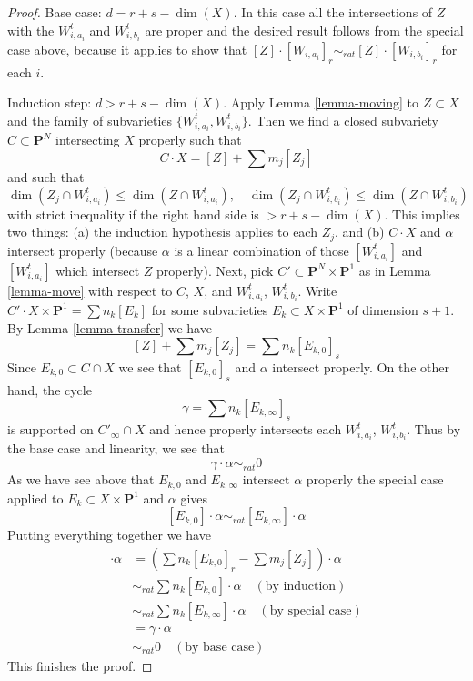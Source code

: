 \begin{proof}
\medskip\noindent
Base case: $d = r + s - \dim(X)$. In this case all the intersections of
$Z$ with the $W_{i, a_i}^t$ and $W_{i, b_i}^t$ are proper and the
desired result follows from the special case above, because
it applies to show that
$[Z] \cdot [W_{i, a_i}]_r \sim_{rat} [Z] \cdot [W_{i, b_i}]_r$ for
each $i$.

\medskip\noindent
Induction step: $d >  r + s - \dim(X)$. Apply
Lemma \ref{lemma-moving} to $Z \subset X$ and
the family of subvarieties $\{W_{i, a_i}^t, W_{i, b_i}^t\}$. Then we find a
closed subvariety $C \subset \mathbf{P}^N$ intersecting $X$
properly such that
$$
C \cdot X = [Z] + \sum m_j [Z_j]
$$
and such that
$$
\dim(Z_j \cap W_{i, a_i}^t) \leq \dim(Z \cap W_{i, a_i}^t),\quad
\dim(Z_j \cap W_{i, b_i}^t) \leq \dim(Z \cap W_{i, b_i}^t)
$$
with strict inequality if the right hand side is $> r + s - \dim(X)$.
This implies two things: (a) the induction hypothesis applies to
each $Z_j$, and (b) $C \cdot X$ and $\alpha$ intersect properly (because
$\alpha$ is a linear combination of those $[W_{i, a_i}^t]$ and
$[W_{i, a_i}^t]$ which intersect $Z$ properly).
Next, pick $C' \subset \mathbf{P}^N \times \mathbf{P}^1$
as in Lemma \ref{lemma-move} with respect to $C$, $X$, and
$W_{i, a_i}^t$, $W_{i, b_i}^t$.
Write $C' \cdot X \times \mathbf{P}^1 = \sum n_k [E_k]$ for
some subvarieties $E_k \subset X \times \mathbf{P}^1$ of
dimension $s + 1$. By Lemma \ref{lemma-transfer} we have
$$
[Z] + \sum m_j [Z_j] = \sum n_k[E_{k, 0}]_s
$$
Since $E_{k, 0} \subset C \cap X$ we see that $[E_{k, 0}]_s$ and $\alpha$
intersect properly. On the other hand, the cycle
$$
\gamma = \sum n_k[E_{k, \infty}]_s
$$
is supported on $C'_\infty \cap X$ and hence
properly intersects each $W_{i, a_i}^t$, $W_{i, b_i}^t$.
Thus by the base case and linearity, we see that
$$
\gamma \cdot \alpha \sim_{rat} 0
$$
As we have see above that $E_{k, 0}$ and $E_{k, \infty}$
intersect $\alpha$ properly the special case applied
to $E_k \subset X \times \mathbf{P}^1$ and $\alpha$ gives
$$
[E_{k, 0}] \cdot \alpha \sim_{rat} [E_{k, \infty}] \cdot \alpha
$$
Putting everything together we have
\begin{align*}
[Z] \cdot \alpha
& =
(\sum n_k[E_{k, 0}]_r - \sum m_j[Z_j]) \cdot \alpha \\
& \sim_{rat}
\sum n_k [E_{k, 0}] \cdot \alpha \quad (\text{by induction})\\
& \sim_{rat}
\sum n_k [E_{k, \infty}] \cdot \alpha \quad (\text{by special case})\\
& =
\gamma \cdot \alpha \\
& \sim_{rat}
0 \quad (\text{by base case})
\end{align*}
This finishes the proof.
\end{proof}



